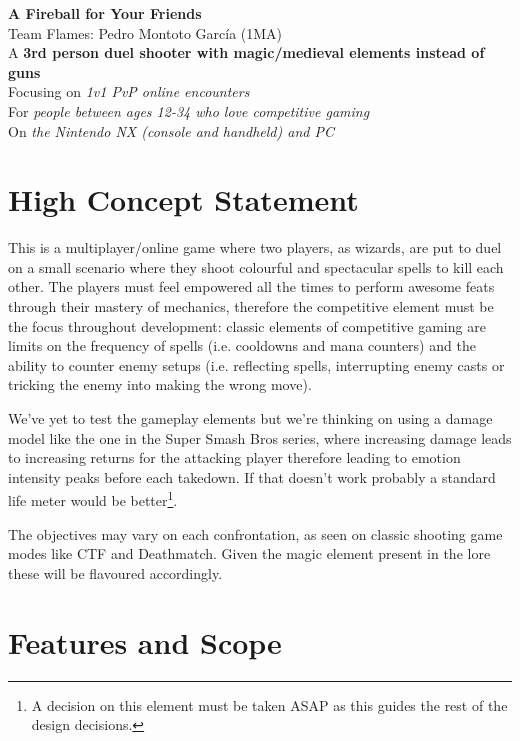\documentclass[a4paper, 11pt]{article}
\begin{document}
\large\textbf{A Fireball for Your Friends} \hfill \\
\normalsize Team Flames: Pedro Montoto García (1MA) \\
A \textbf{3rd person duel shooter with magic/medieval elements instead of guns} \\
Focusing on \textit{1v1 PvP online encounters} \\
For \textit{people between ages 12-34 who love competitive gaming} \\
On \textit{the Nintendo NX (console and handheld) and PC} \\

\setlength\parindent{0pt}
\setlength{\parskip}{1em}
\renewcommand{\baselinestretch}{1.5}

\section*{High Concept Statement}

This is a multiplayer/online game where two players, as wizards, are put to duel on a small scenario where they shoot colourful and spectacular spells to kill each other. The players must feel empowered all the times to perform awesome feats through their mastery of mechanics, therefore the competitive element must be the focus throughout development: classic elements of competitive gaming are limits on the frequency of spells (i.e. cooldowns and mana counters) and the ability to counter enemy setups (i.e. reflecting spells, interrupting enemy casts or tricking the enemy into making the wrong move).

We've yet to test the gameplay elements but we're thinking on using a damage model like the one in the Super Smash Bros series, where increasing damage leads to increasing returns for the attacking player therefore leading to emotion intensity peaks before each takedown. If that doesn't work probably a standard life meter would be better\footnote{A decision on this element must be taken ASAP as this guides the rest of the design decisions.}. 

The objectives may vary on each confrontation, as seen on classic shooting game modes like CTF and Deathmatch. Given the magic element present in the lore these will be flavoured accordingly.

\newpage

\section*{Features and Scope}
\end{document}

